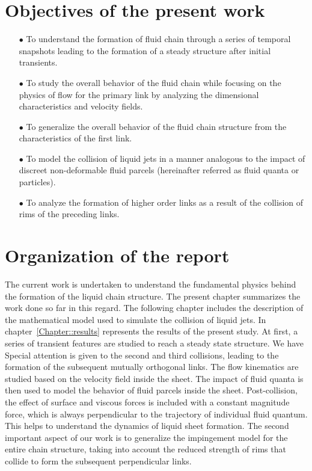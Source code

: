 \section{Objectives of the present work}
\begin{enumerate}
\item [$\bullet$] To understand the formation of fluid chain through a series of temporal snapshots leading to the formation of a steady structure after initial transients.
\item [$\bullet$] To study the overall behavior of the fluid chain while focusing on the physics of flow for the primary link by analyzing the dimensional characteristics and velocity fields.
\item [$\bullet$] To generalize the overall behavior of the fluid chain structure from the characteristics of the first link.
\item [$\bullet$] To model the collision of liquid jets in a manner analogous to the impact of discreet non-deformable fluid parcels (hereinafter referred as fluid quanta or particles). 
\item [$\bullet$] To analyze the formation of higher order links as a result of the collision of rims of the preceding links. 
\end{enumerate}
\section{Organization of the report}
The current work is undertaken to understand the fundamental physics behind the formation of the liquid chain structure. The present chapter summarizes the work done so far in this regard. The following chapter includes the description of the mathematical model used to simulate the collision of liquid jets. In chapter~\ref{Chapter::results} represents the results of the present study. At first, a series of transient features are studied to reach a steady state structure. We have  Special attention is given to the second and third collisions, leading to the formation of the subsequent mutually orthogonal links. The flow kinematics are studied based on the velocity field inside the sheet. The impact of fluid quanta is then used to model the behavior of fluid parcels inside the sheet. Post-collision, the effect of surface and viscous forces is included with a constant magnitude force, which is always perpendicular to the trajectory of individual fluid quantum. This helps to understand the dynamics of liquid sheet formation. The second important aspect of our work is to generalize the impingement model for the entire chain structure, taking into account the reduced strength of rims that collide to form the subsequent perpendicular links.
